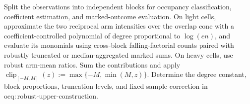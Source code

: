 Split the observations into independent blocks for occupancy classification, coefficient estimation, and marked-outcome evaluation. On light cells, approximate the two reciprocal arm intensities over the overlap cone with a coefficient-controlled polynomial of degree proportional to \(\log(en)\), and evaluate its monomials using cross-block falling-factorial counts paired with robustly truncated or median-aggregated marked sums. On heavy cells, use robust arm-mean ratios. Sum the contributions and apply \(\operatorname{clip}_{[-M,M]}(z):=\max\{-M,\min(M,z)\}\). Determine the degree constant, block proportions, truncation levels, and fixed-sample correction in \(\mathrm{oeq:robust\text{-}upper\text{-}construction}\).
